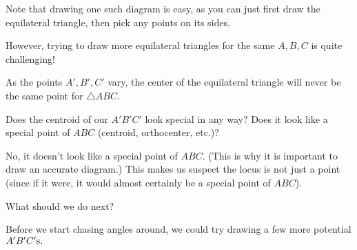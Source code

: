 Note that drawing one such diagram is easy, as you can just first draw the equilateral triangle, then pick any points on its sides.

However, trying to draw more equilateral triangles for the same $A,B,C$  is quite challenging!






As the points  $A',B',C'$ vary, the center of the equilateral triangle will never be the same point for  $\triangle ABC$.

Does the centroid of our $A'B'C'$ look special in any way? Does it look like a special point of $ABC$ (centroid, orthocenter, etc.)?


No, it doesn't look like a special point of $ABC.$  (This is why it is important to draw an accurate diagram.)  This makes us suspect the locus is not just a point (since if it were, it would almost certainly be a special point of $ABC$).

What should we do next?



Before we start chasing angles around, we could try drawing a few more potential $A'B'C'\text s.$




